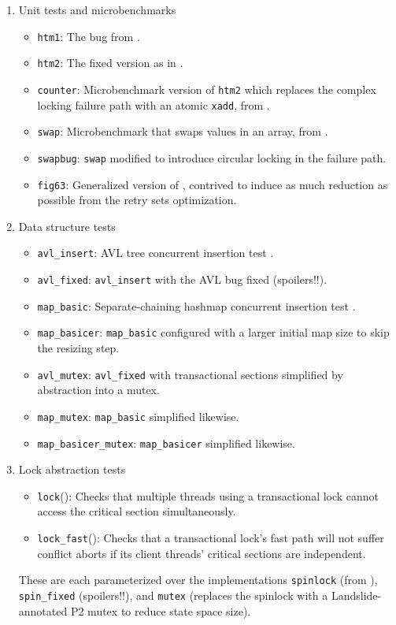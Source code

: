 \begin{enumerate}
	\item Unit tests and microbenchmarks
	\begin{itemize}
		\item {\tt htm1}: The bug from .
		\item {\tt htm2}: The fixed version as in .
		\item {\tt counter}: Microbenchmark version of {\tt htm2} which replaces the complex locking failure path with an atomic {\tt xadd}, from \cite{tm-benchmark-cmu}.
		\item {\tt swap}: Microbenchmark that swaps values in an array, from \cite{tm-benchmark-cmu}.
		\item {\tt swapbug}: {\tt swap} modified to introduce circular locking in the failure path. %
		\item {\tt fig63}: Generalized version of ,
			contrived to induce as much reduction as possible from the retry sets optimization.
	\end{itemize}
	\item Data structure tests
	\begin{itemize}
		\item {\tt avl\_insert}: AVL tree concurrent insertion test \cite{tm-benchmark-cmu}.
		\item {\tt avl\_fixed}: {\tt avl\_insert} with the AVL bug fixed (spoilers!!).
		\item {\tt map\_basic}: Separate-chaining hashmap concurrent insertion test \cite{tm-benchmark-cmu}.
		\item {\tt map\_basicer}: {\tt map\_basic} configured with a larger initial map size to skip the resizing step.
		\item {\tt avl\_mutex}: {\tt avl\_fixed} with transactional sections simplified by abstraction into a mutex.
		\item {\tt map\_mutex}: {\tt map\_basic} simplified likewise.
		\item {\tt map\_basicer\_mutex}: {\tt map\_basicer} simplified likewise.
	\end{itemize}
	\item Lock abstraction tests
	\begin{itemize}
		\item {\tt lock}(): Checks that multiple threads using a transactional lock
			cannot access the critical section simultaneously.
		\item {\tt lock\_fast}(): Checks that a transactional lock's fast path will not suffer conflict aborts
			if its client threads' critical sections are independent.
	\end{itemize}
		These are each parameterized over the implementations {\tt spinlock} (from \cite{spinlock-rtm-github}),
		{\tt spin\_\allowbreak{}fixed} (spoilers!!),
		and {\tt mutex} (replaces the spinlock with a Landslide-annotated P2 mutex to reduce state space size).
\end{enumerate}

